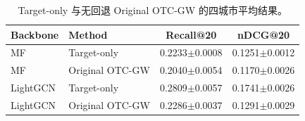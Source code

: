 \begin{table}[t]
\centering
\caption{Target-only 与无回退 Original OTC-GW 的四城市平均结果。}
\label{tab:negative_transfer}
\begin{tabular}{llcc}
\toprule
Backbone & Method & Recall@20 & nDCG@20 \\
\midrule
MF & Target-only & 0.2233$\pm$0.0008 & 0.1251$\pm$0.0012 \\
MF & Original OTC-GW & 0.2040$\pm$0.0054 & 0.1170$\pm$0.0026 \\
LightGCN & Target-only & 0.2809$\pm$0.0057 & 0.1741$\pm$0.0026 \\
LightGCN & Original OTC-GW & 0.2286$\pm$0.0037 & 0.1291$\pm$0.0029 \\
\bottomrule
\end{tabular}
\end{table}